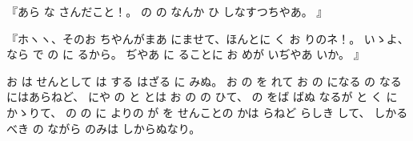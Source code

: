 『あら
な
さんだこと！。
の
の
なんか
ひ
しなすつちやあ。
』

『ホヽヽ、そのお
ちやんがまあ
にませて、ほんとに
く
お
りのネ！。
いゝよ、
なら
で
の
に
るから。
ぢやあ
に
ることに
お
めが
いぢやあ
いか。
』

お
は
せんとして
は
する
はざる
に
みぬ。
お
の
を
れて
お
の
になる
の
なるにはあらねど、
にや
の
と
とは
お
の
の
ひて、
の
をば
ばぬ
なるが
と
く
にかゝりて、
の
の
に
よりの
が
を
せんことの
かは
らねど
らしき
して、
しかるべき
の
ながら
のみは
しからぬなり。

